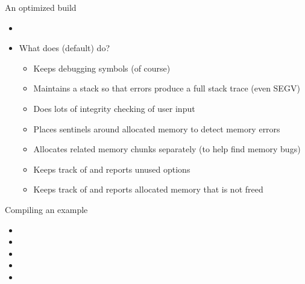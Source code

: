 \begin{frame}{An optimized build}
  \begin{itemize}
  \item {}
  \item What does  (default) do?
    \begin{itemize}
    \item Keeps debugging symbols (of course)
    \item Maintains a stack so that errors produce a full stack trace (even SEGV)
    \item Does lots of integrity checking of user input
    \item Places sentinels around allocated memory to detect memory errors
    \item Allocates related memory chunks separately (to help find memory bugs)
    \item Keeps track of and reports unused options
    \item Keeps track of and reports allocated memory that is not freed \\
      \quad {}
    \end{itemize}
  \end{itemize}
\end{frame}

\begin{frame}{Compiling an example}
\begin{itemize}
  \item {}
  \item {}
  \item {}
  \item {}
  \item {}
\end{itemize}
\end{frame}
